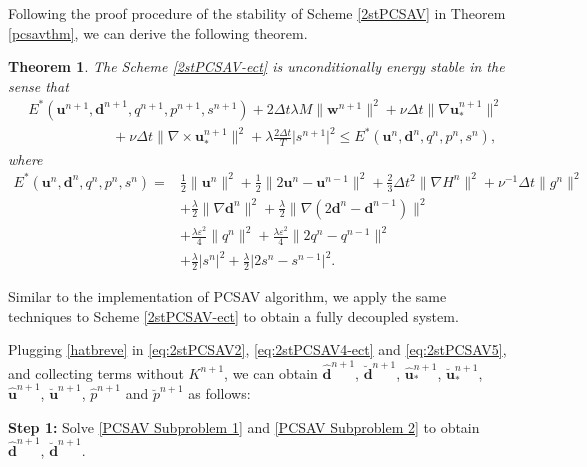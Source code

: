 \documentclass[12pt,reqno]{amsart}
\numberwithin{equation}{section}
\newtheorem{theorem}{Theorem}[section]
\newcommand{\uu}{\mathrm{\textbf{u}}}
\newcommand{\dd}{\mathrm{\textbf{d}}}
\newcommand{\ww}{\mathrm{\textbf{w}}}
\begin{document}
Following the proof procedure of the stability of Scheme \ref{2stPCSAV} in Theorem \ref{pcsavthm}, we can derive the following theorem.

\begin{theorem}\label{pcsav-ectthm} The Scheme \ref{2stPCSAV-ect} is unconditionally energy stable in the sense that
\begin{equation}\label{2stenergy-ect}
\begin{aligned}
&E^*\left(\uu^{n+1},\dd^{n+1},q^{n+1},p^{n+1},s^{n+1}\right)+2\Delta t\lambda M\lVert \ww^{n+1}\rVert^2+\nu\Delta t\lVert \nabla\uu_*^{n+1}\rVert^2
\\
&\qquad\qquad\qquad+\nu\Delta t \lVert \nabla\times\uu_*^{n+1}\rVert^2
+\lambda\frac{2\Delta t}{T}\lvert s^{n+1}\rvert^2
\leq E^*\left(\uu^{n},\dd^{n},q^{n},p^{n},s^{n}\right),
\end{aligned}
\end{equation}
where
\begin{align*}
E^*\left(\uu^{n},\dd^{n},q^{n},p^{n},s^{n}\right)=&\frac{1}{2}\lVert\uu^{n}\rVert^2+\frac{1}{2}\lVert2\uu^{n}-\uu^{n-1}\rVert^2+\frac{2}{3}\Delta t^2\lVert\nabla H^{n}\rVert^2
+\nu^{-1}\Delta t\lVert g^{n}\rVert^2\\
&+\frac{\lambda}{2}\lVert\nabla\dd^{n}\rVert^2
+\frac{\lambda}{2}\lVert\nabla\left(2\dd^{n}-\dd^{n-1}\right)\rVert^2\\
&+\frac{\lambda\varepsilon^2}{4}\lVert q^{n}\rVert^2
+\frac{\lambda\varepsilon^2}{4}\lVert 2q^{n}-q^{n-1}\rVert^2\\
&+\frac{\lambda}{2}\lvert s^{n}\rvert^2
+\frac{\lambda}{2}\lvert 2s^{n}-s^{n-1}\rvert^2.
\end{align*}
\end{theorem}

Similar to the implementation of PCSAV algorithm, we apply the same techniques to Scheme \ref{2stPCSAV-ect} to obtain a fully decoupled system.

Plugging \eqref{hatbreve} in \eqref{eq:2stPCSAV2}, \eqref{eq:2stPCSAV4-ect} and \eqref{eq:2stPCSAV5}, and collecting terms without $K^{n+1}$, we can obtain $\hat{\dd}^{n+1}$, $\breve{\dd}^{n+1}$,  $\hat{\uu}_*^{n+1}$, $\breve{\uu}_*^{n+1}$,  $\hat{\uu}^{n+1}$, $\breve{\uu}^{n+1}$,  $\hat{p}^{n+1}$ and $\breve{p}^{n+1}$ as follows:

\textbf{Step 1:} Solve \eqref{PCSAV Subproblem 1} and \eqref{PCSAV Subproblem 2} to obtain $\hat{\dd}^{n+1}$, $\breve{\dd}^{n+1}$.
\end{document}
